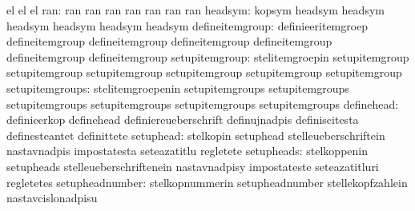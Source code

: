                                   el                               el  %
                                  el %
                             ran: ran                              ran
                                  ran                              ran
                                  ran                              ran
                                  ran
                         headsym: kopsym                           headsym
                                  headsym                          headsym
                                  headsym                          headsym
                                  headsym
                 defineitemgroup: definieeritemgroep               defineitemgroup
                                  defineitemgroup                  defineitemgroup
                                  defineitemgroup                  defineitemgroup
                                  defineitemgroup
                  setupitemgroup: stelitemgroepin                  setupitemgroup
                                  setupitemgroup                   setupitemgroup
                                  setupitemgroup                   setupitemgroup
                                  setupitemgroup
                 setupitemgroups: stelitemgroepenin                setupitemgroups
                                  setupitemgroups                  setupitemgroups
                                  setupitemgroups                  setupitemgroups
                                  setupitemgroups
                      definehead: definieerkop                     definehead
                                  definiereueberschrift            definujnadpis
                                  definiscitesta                   definesteantet
                                  definittete
                       setuphead: stelkopin                        setuphead
                                  stelleueberschriftein            nastavnadpis
                                  impostatesta                     seteazatitlu
                                  regletete
                      setupheads: stelkoppenin                     setupheads
                                  stelleueberschriftenein          nastavnadpisy
                                  impostateste                     seteazatitluri
                                  regletetes
                 setupheadnumber: stelkopnummerin                  setupheadnumber
                                  stellekopfzahlein                nastavcislonadpisu
